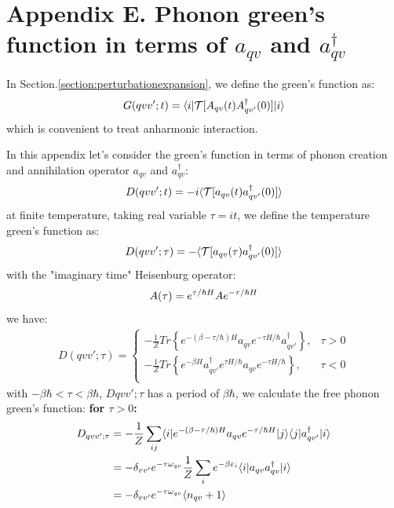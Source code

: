 \documentclass{article}
\begin{document}
\pagebreak
\section*{Appendix E. Phonon green's function in terms of $a_{qv}$ and $a_{qv}^{\dagger}$}
In Section.\ref{section:perturbationexpansion}, we define the green's function as:
\begin{align}
    G(qvv';t) = \langle i | \mathcal{T}[A_{qv}(t)A_{qv'}^{\dagger}(0)]| i \rangle \notag
\end{align}
which is convenient to treat anharmonic interaction. 

In this appendix let's consider 
the green's function in terms of phonon creation and annihilation operator $a_{qv}$ and $a^{\dagger}_{qv}$:
\begin{equation}
    D(qvv';t) = -i \langle  \mathcal{T}[a_{qv}(t)a_{qv'}^{\dagger}(0)] \rangle \notag
\end{equation}
at finite temperature, taking real variable $\tau = it$, we define the temperature green's function as:
\begin{equation}
    D(qvv';\tau) = -\langle  \mathcal{T}[a_{qv}(\tau)a_{qv'}^{\dagger}(0)] \rangle \notag
\end{equation}
with the "imaginary time" Heisenburg operator:
\begin{equation}
    A(\tau) = e^{\tau/\hbar H} A e^{-\tau/\hbar H} \notag 
\end{equation}
we have:
\begin{align}
    D(qvv';\tau) = 
    \begin{cases}
        -\frac{1}{Z} Tr\left\{ e^{-(\beta-\tau/\hbar)H} a_{qv} e^{-\tau H/\hbar } a_{qv'}^{\dagger} \right\}, &\tau > 0 \\
        -\frac{1}{Z} Tr\left\{ e^{-\beta H} a_{qv'}^{\dagger} e^{\tau H/\hbar } a_{qv} e^{- \tau H/\hbar } \right\}, &\tau < 0 \\
    \end{cases}
\end{align}
with $-\beta\hbar < \tau < \beta \hbar$,
$D{qvv';\tau}$ has a period of $\beta\hbar$, we calculate the free phonon green's function:
\textbf{for $\tau > 0$:}
\begin{align}
    D_{qvv';\tau} &= -\frac{1}{Z} \sum_{ij} 
                    \langle i | e^{-(\beta-\tau/\hbar)H} a_{qv} e^{-\tau/\hbar H} | j\rangle \langle j | a^{\dagger}_{qv'} | i \rangle \notag \\
                  &= -\delta_{vv'} e^{-\tau\omega_{qv}} \frac{1}{Z} \sum_i e^{-\beta \varepsilon_i} \langle i | a_{qv} a^{\dagger}_{qv} | i\rangle \notag \\
                  &= -\delta_{vv'} e^{-\tau\omega_{qv}} \langle n_{qv} + 1 \rangle 
\end{align}
\end{document}
